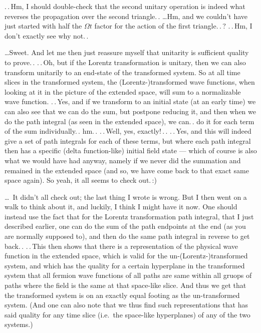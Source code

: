 \documentclass{report}
\begin{document}
.\,.\,Hm, I should double-check that the second unitary operation is indeed what reverses the propagation over the second triangle.\,. %
\ldots Hm, and we couldn't have just started with half the $\Omega t$ factor for the action of the first triangle.\,.\,? %
.\,.\,Hm, I don't exactly see why not.\,. 

\ldots Sweet. And let me then just reassure myself that unitarity is sufficient quality to prove.\,. 
.\,.\,Oh, but if the Lorentz transformation is unitary, then we can also transform unitarily to an end-state of the transformed system. So at all time slices in the transformed system, the (Lorentz-)transformed wave functions, when looking at it in the picture of the extended space, will sum to a normalizable wave function. .\,.\,Yes, and if we transform to an initial state (at an early time) we can also see that we can do the sum, but postpone reducing it, and then when we do the path integral (as seen in the extended space), we can.\,. do it for each term of the sum individually.\,. hm.\,. .\,.\,Well, yes, exactly!\,.\,. .\,.\,Yes, and this will indeed give a set of path integrals for each of these terms, but where each path integral then has a specific (delta function-like) initial field state --- which of course is also what we would have had anyway, namely if we never did the summation and remained in the extended space (and so, we have come back to that exact same space again). So yeah, it all seems to check out.\,:) %

\ldots\ It didn't all check out; the last thing I wrote is wrong. But I then went on a walk to think about it, and luckily, I think I might have it now. One should instead use the fact that for the Lorentz transformation path integral, that I just described earlier, one can do the sum of the path endpoints at the end (as you are normally supposed to), and then do the same path integral in reverse to get back.\,. .\,.\,This then shows that there is a representation of the physical wave function in the extended space, which is valid for the un-(Lorentz-)transformed system, and which has the quality for a certain hyperplane in the transformed system that all fermion wave functions of all paths are same within all gruops of paths where the field is the same at that space-like slice. And thus we get that the transformed system is on an exactly equal footing as the un-transformed system. (And one can also note that we thus find such representations that has said quality for any time slice (i.e.\ the space-like hyperplanes) of any of the two systems.) %
\end{document}

